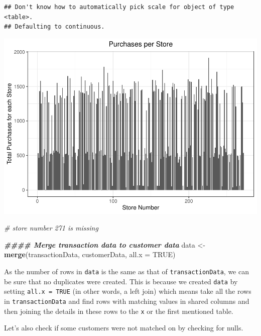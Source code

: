 \documentclass[
]{article}
\newenvironment{Shaded}{\begin{snugshade}}{\end{snugshade}}
\newcommand{\AttributeTok}[1]{\textcolor[rgb]{0.13,0.29,0.53}{#1}}
\newcommand{\CommentTok}[1]{\textcolor[rgb]{0.56,0.35,0.01}{\textit{#1}}}
\newcommand{\ConstantTok}[1]{\textcolor[rgb]{0.56,0.35,0.01}{#1}}
\newcommand{\DocumentationTok}[1]{\textcolor[rgb]{0.56,0.35,0.01}{\textbf{\textit{#1}}}}
\newcommand{\FunctionTok}[1]{\textcolor[rgb]{0.13,0.29,0.53}{\textbf{#1}}}
\newcommand{\NormalTok}[1]{#1}
\newcommand{\OtherTok}[1]{\textcolor[rgb]{0.56,0.35,0.01}{#1}}
\begin{document}
\begin{verbatim}
## Don't know how to automatically pick scale for object of type <table>.
## Defaulting to continuous.
\end{verbatim}

\includegraphics{template_files/figure-latex/1 Exploratory data analysis-1.pdf}

\begin{Shaded}
\begin{Highlighting}[]
\CommentTok{\# store number 271 is missing}
\end{Highlighting}
\end{Shaded}

\begin{Shaded}
\begin{Highlighting}[]
\DocumentationTok{\#\#\#\# Merge transaction data to customer data}
\NormalTok{data }\OtherTok{\textless{}{-}} \FunctionTok{merge}\NormalTok{(transactionData, customerData, }\AttributeTok{all.x =} \ConstantTok{TRUE}\NormalTok{)}
\end{Highlighting}
\end{Shaded}

As the number of rows in \texttt{data} is the same as that of
\texttt{transactionData}, we can be sure that no duplicates were
created. This is because we created \texttt{data} by setting
\texttt{all.x\ =\ TRUE} (in other words, a left join) which means take
all the rows in \texttt{transactionData} and find rows with matching
values in shared columns and then joining the details in these rows to
the \texttt{x} or the first mentioned table.

Let's also check if some customers were not matched on by checking for
nulls.
\end{document}
